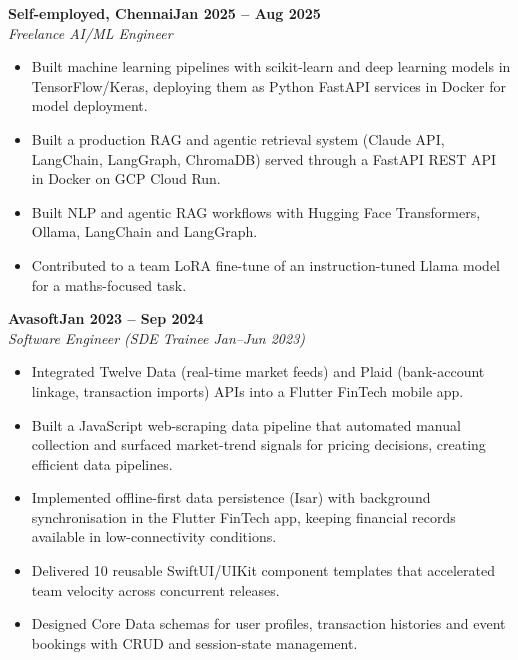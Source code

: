 \documentclass[a4paper,11pt]{article}
\newcommand{\entry}[4]{\needspace{4\baselineskip}\noindent\textbf{#1}\hfill\textbf{#2}\\ \textit{#3}\hfill\textit{#4}\par}
\begin{document}
\vspace{4pt}
\entry{Self-employed, Chennai}{Jan 2025 – Aug 2025}{Freelance AI/ML Engineer}{}
\begin{itemize}
  \item Built machine learning pipelines with scikit-learn and deep learning models in TensorFlow/Keras, deploying them as Python FastAPI services in Docker for model deployment.
  \item Built a production RAG and agentic retrieval system (Claude API, LangChain, LangGraph, ChromaDB) served through a FastAPI REST API in Docker on GCP Cloud Run.
  \item Built NLP and agentic RAG workflows with Hugging Face Transformers, Ollama, LangChain and LangGraph.
  \item Contributed to a team LoRA fine-tune of an instruction-tuned Llama model for a maths-focused task.
\end{itemize}
\vspace{4pt}
\entry{Avasoft}{Jan 2023 – Sep 2024}{Software Engineer (SDE Trainee Jan–Jun 2023)}{}
\begin{itemize}
  \item Integrated Twelve Data (real-time market feeds) and Plaid (bank-account linkage, transaction imports) APIs into a Flutter FinTech mobile app.
  \item Built a JavaScript web-scraping data pipeline that automated manual collection and surfaced market-trend signals for pricing decisions, creating efficient data pipelines.
  \item Implemented offline-first data persistence (Isar) with background synchronisation in the Flutter FinTech app, keeping financial records available in low-connectivity conditions.
  \item Delivered 10 reusable SwiftUI/UIKit component templates that accelerated team velocity across concurrent releases.
  \item Designed Core Data schemas for user profiles, transaction histories and event bookings with CRUD and session-state management.
\end{itemize}

\end{document}
